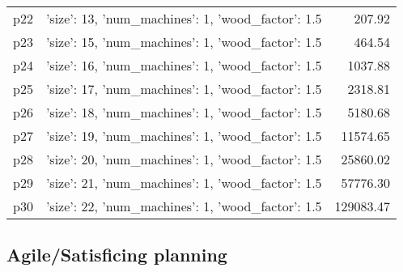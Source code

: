 \documentclass{article}
\begin{document}
\begin{center}
\begin{tabular}{@{}l|r|r@{}}
  p22&{'size': 13, 'num\_machines': 1, 'wood\_factor': 1.5}&207.92\\
  p23&{'size': 15, 'num\_machines': 1, 'wood\_factor': 1.5}&464.54\\
  p24&{'size': 16, 'num\_machines': 1, 'wood\_factor': 1.5}&1037.88\\
  p25&{'size': 17, 'num\_machines': 1, 'wood\_factor': 1.5}&2318.81\\
  p26&{'size': 18, 'num\_machines': 1, 'wood\_factor': 1.5}&5180.68\\
  p27&{'size': 19, 'num\_machines': 1, 'wood\_factor': 1.5}&11574.65\\
  p28&{'size': 20, 'num\_machines': 1, 'wood\_factor': 1.5}&25860.02\\
  p29&{'size': 21, 'num\_machines': 1, 'wood\_factor': 1.5}&57776.30\\
  p30&{'size': 22, 'num\_machines': 1, 'wood\_factor': 1.5}&129083.47
                            \end{tabular}
                            \end{center}
                    

                                \subsection*{Agile/Satisficing planning}
                                
\end{document}
